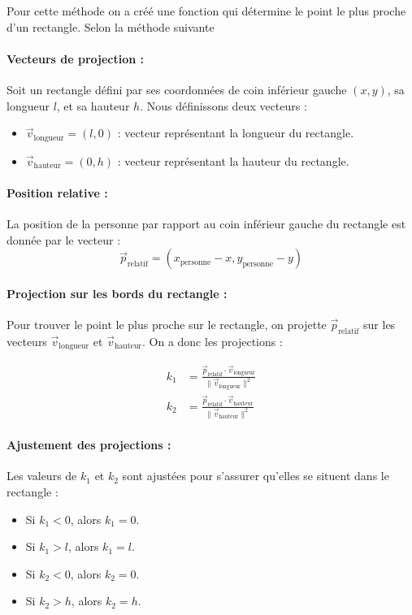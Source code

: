 \documentclass[a4paper,12pt]{article}
\begin{document}
Pour cette méthode on a créé une fonction qui détermine le point le plus proche d'un rectangle. Selon la méthode suivante


\paragraph{Vecteurs de projection :}

Soit un rectangle défini par ses coordonnées de coin inférieur gauche $(x, y)$, sa longueur $l$, et sa hauteur $h$. Nous définissons deux vecteurs :
\begin{itemize}
    \item $\vec{v}_{\text{longueur}} = (l, 0)$ : vecteur représentant la longueur du rectangle.
    \item $\vec{v}_{\text{hauteur}} = (0, h)$ : vecteur représentant la hauteur du rectangle.
\end{itemize}

\paragraph{Position relative :}

La position de la personne par rapport au coin inférieur gauche du rectangle est donnée par le vecteur :
\[
\vec{p}_{\text{relatif}} = (x_{\text{personne}} - x, y_{\text{personne}} - y)
\]

\paragraph{Projection sur les bords du rectangle :}

Pour trouver le point le plus proche sur le rectangle, on projette $\vec{p}_{\text{relatif}}$ sur les vecteurs $\vec{v}_{\text{longueur}}$ et $\vec{v}_{\text{hauteur}}$. On a donc les projections :

\begin{align*}
k_1 &= \frac{\vec{p}_{\text{relatif}} \cdot \vec{v}_{\text{longueur}}}{\|\vec{v}_{\text{longueur}}\|^2} \\
k_2 &= \frac{\vec{p}_{\text{relatif}} \cdot \vec{v}_{\text{hauteur}}}{\|\vec{v}_{\text{hauteur}}\|^2}
\end{align*}

\paragraph{Ajustement des projections :}

Les valeurs de $k_1$ et $k_2$ sont ajustées pour s'assurer qu'elles se situent dans le rectangle :
\begin{itemize}
    \item Si $k_1 < 0$, alors $k_1 = 0$.
    \item Si $k_1 > l$, alors $k_1 = l$.
    \item Si $k_2 < 0$, alors $k_2 = 0$.
    \item Si $k_2 > h$, alors $k_2 = h$.
\end{itemize}
\end{document}
